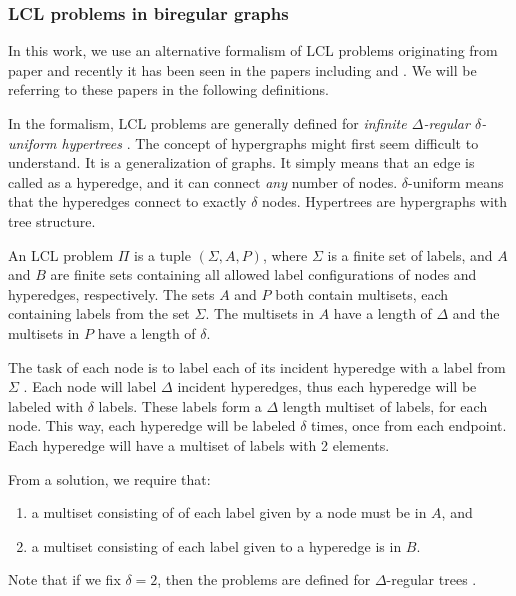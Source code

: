 \subsubsection{LCL problems in biregular graphs}
In this work, we use an alternative formalism of LCL problems originating from paper \cite{DBLP:conf/podc/Brandt19} and recently it has been seen in the papers including \cite{DBLP:conf/podc/Olivetti20} and \cite{DBLP:journals/sigact/Suomela20}.
We will be referring to these papers in the following definitions.

In the formalism, LCL problems are generally defined for \emph{infinite $\Delta$-regular $\delta$-uniform hypertrees} \cite{DBLP:conf/podc/Olivetti20}.
The concept of hypergraphs might first seem difficult to understand.
It is a generalization of graphs.
It simply means that an edge is called as a hyperedge, and it can connect \emph{any} number of nodes.
$\delta$-uniform means that the hyperedges connect to exactly $\delta$ nodes.
Hypertrees are hypergraphs with tree structure.

An LCL problem $\Pi$ is a tuple $(\Sigma, A, P)$, where $\Sigma$ is a finite set of labels, and $A$ and $B$ are finite sets containing all allowed label configurations of nodes and hyperedges, respectively.
The sets $A$ and $P$ both contain multisets, each containing labels from the set $\Sigma$.
The multisets in $A$ have a length of $\Delta$ and the multisets in $P$ have a length of $\delta$.

The task of each node is to label each of its incident hyperedge with a label from $\Sigma$ \cite{DBLP:journals/sigact/Suomela20}.
Each node will label $\Delta$ incident hyperedges, thus each hyperedge will be labeled with $\delta$ labels.
These labels form a $\Delta$ length multiset of labels, for each node.
This way, each hyperedge will be labeled $\delta$ times, once from each endpoint.
Each hyperedge will have a multiset of labels with 2 elements.

From a solution, we require that:
\begin{enumerate}
  \item a multiset consisting of of each label given by a node must be in $A$, and
  \item a multiset consisting of each label given to a hyperedge is in $B$.
\end{enumerate}

Note that if we fix $\delta=2$, then the problems are defined for $\Delta$-regular trees \cite{DBLP:conf/podc/Olivetti20}.

